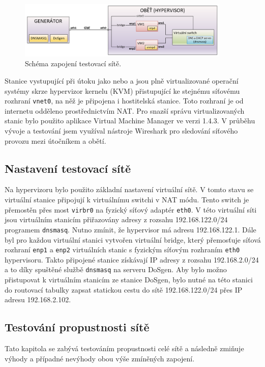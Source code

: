 \begin{figure} [ht]
	\centering
	\includegraphics[width=0.9\textwidth]{obrazky/lab_schema.png}
	\caption{Schéma zapojení testovací sítě.}
	\label{fig:vut-lab-schema}
\end{figure}


Stanice vystupující při útoku jako  nebo  a  jsou plně virtualizované operační systémy skrze hypervizor kernelu (KVM) přistupující ke stejnému síťovému rozhraní \texttt{vnet0}, na něž je připojena i hostitelská stanice. Toto rozhraní je od internetu odděleno prostřednictvím NAT. Pro snazší správu virtualizovaných stanic bylo použito aplikace Virtual Machine Manager ve verzi 1.4.3. V průběhu vývoje a testování jsem využíval nástroje Wireshark pro sledování síťového provozu mezi útočníkem a obětí.

\subsection{Nastavení testovací sítě}
Na hypervizoru bylo použito základní nastavení virtuální sítě. V tomto stavu se virtuální stanice připojují k virtuálnímu switchi v NAT módu. Tento switch je přemostěn přes most \texttt{virbr0} na fyzický síťový adaptér \texttt{eth0}. V této virtuální síti jsou virtuálním stanicím přiřazovány adresy z rozsahu 192.168.122.0/24 programem \texttt{dnsmasq}. Nutno zmínit, že hypervisor má adresu 192.168.122.1. Dále byl pro každou virtuální stanici vytvořen virtuální bridge, který přemosťuje síťová rozhraní \texttt{enp1} a  \texttt{enp2} virtuálních stanic s fyzickým síťovým rozhraním \texttt{eth0} hypervisoru. Takto připojené stanice získávají IP adresy z rozsahu 192.168.2.0/24 a to díky spuštěné službě \texttt{dnsmasq} na serveru DoSgen. Aby bylo možno přistupovat k virtuálním stanicím ze stanice DoSgen, bylo nutné na této stanici do routovací tabulky zapsat statickou cestu do sítě 192.168.122.0/24 přes IP adresu 192.168.2.102.

\subsection{Testování propustnosti sítě}
Tato kapitola se zabývá testováním propustnosti celé sítě a následně zmiňuje výhody a případné nevýhody obou výše zmíněných zapojení.

